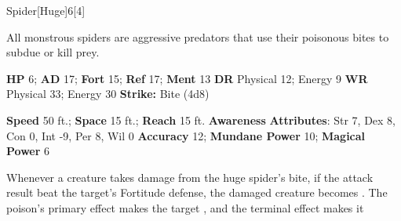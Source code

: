   \begin{monsection}{Spider}[Huge]{6}[4]
    \vspace{-1em}\vspace{-1em}
    \vspace{0em}

    
    All monstrous spiders are aggressive predators that use their poisonous bites to subdue or kill prey.
  

    \begin{spellcontent}
      \begin{spelltargetinginfo}
        \pari \textbf{HP} 6;
          \textbf{AD} 17;
          \textbf{Fort} 15;
          \textbf{Ref} 17;
          \textbf{Ment} 13
        \pari \textbf{DR} Physical 12; Energy 9
        \pari \textbf{WR} Physical 33; Energy 30
        \pari \textbf{Strike:}
            Bite  (4d8)
      \end{spelltargetinginfo}
    \end{spellcontent}
    \begin{monsterfooter}
      \pari \textbf{Speed} 50 ft.;
        \textbf{Space} 15 ft.;
        \textbf{Reach} 15 ft.
      \pari \textbf{Awareness} 
      \pari \textbf{Attributes}:
        Str 7, Dex 8,
        Con 0, Int -9,
        Per 8, Wil 0
      \pari \textbf{Accuracy} 12;
        \textbf{Mundane Power} 10;
      \textbf{Magical Power} 6
    \end{monsterfooter}
  \end{monsection}
    Whenever a creature takes damage from the huge spider's bite,
      if the attack result beat the target's Fortitude defense,
      the damaged creature becomes .
    The poison's primary effect makes the target , and the terminal effect makes it 
  
